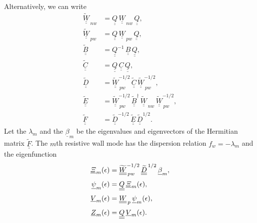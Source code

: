 \documentclass[12pt,prb,aps,notitlepage]{revtex4-1}
\begin{document}
Alternatively, we can write
\begin{align}
\underline{\underline{\widetilde{W}}}_{\,nw}&= \underline{\underline{Q}}\,\underline{\underline{W}}_{\,nw}\,\underline{\underline{Q}},\\[0.5ex]
\underline{\underline{\widetilde{W}}}_{\,pw}&= \underline{\underline{Q}}\,\underline{\underline{W}}_{\,pw}\,\underline{\underline{Q}},\\[0.5ex]
\underline{\underline{\widetilde{B}}}&= \underline{\underline{Q}}^{-1}\,\underline{\underline{B}}\,\underline{\underline{Q}},\\[0.5ex]
\underline{\underline{\widetilde{C}}}&= \underline{\underline{Q}}\,\underline{\underline{C}}\,\underline{\underline{Q}},\\[0.5ex]
\underline{\underline{\widetilde{D}}} &=  \underline{\underline{\widetilde{W}}}_{\,pw}^{-1/2} \,\underline{\underline{\widetilde{C}}} \,\underline{\underline{\widetilde{W}}}_{\,pw}^{-1/2},\\[0.5ex]
\underline{\underline{\widetilde{E}}} &= \underline{\underline{\widetilde{W}}}_{\,pw}^{-1/2}\,\underline{\underline{\widetilde{B}}}^\dag\,\underline{\underline{\widetilde{W}}}_{\,nw}\, \underline{\underline{\widetilde{W}}}_{\,pw}^{-1/2},\\[0.5ex]
\underline{\underline{\widetilde{F}}}&=\underline{\underline{\widetilde{D}}}^{-1/2}\,\underline{\underline{\widetilde{E}}}\,\underline{\underline{\widetilde{D}}}^{1/2}.
\end{align}
Let the $\lambda_m$ and the $\underline{\beta}_m$ be the eigenvalues and eigenvectors of the Hermitian matrix $\underline{\underline{\widetilde{F}}}$. 
The $m$th resistive wall mode has the dispersion relation
$f_w =- \lambda_m$
and the eigenfunction
\begin{align}
\underline{\mit\Xi}_m(\epsilon) &=  \underline{\underline{\widetilde{W}}}_{\,pw}^{-1/2}\, \underline{\underline{\widetilde{D}}}^{\,1/2}\,\underline{\beta}_m,\\[0.5ex]
\underline{\psi}_m(\epsilon)&=  \underline{\underline{Q}}\,\underline{\mit\Xi}_m(\epsilon),\\[0.5ex]
\underline{V}_m(\epsilon) &= \underline{\underline{W}}_{\,p}\,\underline{\psi}_m(\epsilon),\\[0.5ex]
\underline{Z}_m(\epsilon)&= \underline{\underline{Q}}\,\underline{V}_m(\epsilon).
\end{align}
\end{document}
